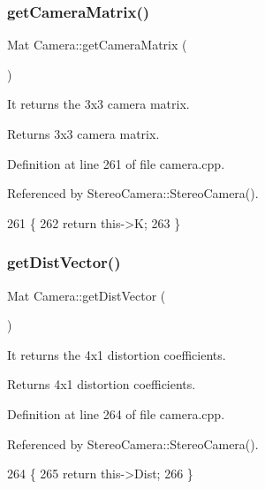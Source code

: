 \subsubsection{\texorpdfstring{get\+Camera\+Matrix()}{getCameraMatrix()}}
{\footnotesize\ttfamily Mat Camera\+::get\+Camera\+Matrix (\begin{DoxyParamCaption}{ }\end{DoxyParamCaption})}



It returns the 3x3 camera matrix. 

\begin{DoxyReturn}{Returns}
3x3 camera matrix. 
\end{DoxyReturn}


Definition at line 261 of file camera.\+cpp.



Referenced by Stereo\+Camera\+::\+Stereo\+Camera().


\begin{DoxyCode}
261                             \{
262     \textcolor{keywordflow}{return} this->K;
263 \}
\end{DoxyCode}
\mbox{\label{classCamera_a1cd15bc4fd4f0405c7e047af632b9353}} 
\subsubsection{\texorpdfstring{get\+Dist\+Vector()}{getDistVector()}}
{\footnotesize\ttfamily Mat Camera\+::get\+Dist\+Vector (\begin{DoxyParamCaption}{ }\end{DoxyParamCaption})}



It returns the 4x1 distortion coefficients. 

\begin{DoxyReturn}{Returns}
4x1 distortion coefficients. 
\end{DoxyReturn}


Definition at line 264 of file camera.\+cpp.



Referenced by Stereo\+Camera\+::\+Stereo\+Camera().


\begin{DoxyCode}
264                           \{
265     \textcolor{keywordflow}{return} this->Dist;
266 \}
\end{DoxyCode}
\mbox{\label{classCamera_a979043e0e738bf3858de6476e12b5a67}} 
